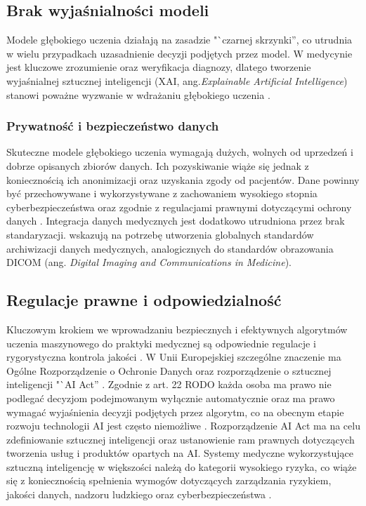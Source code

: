 \subsection{Brak wyjaśnialności modeli}
Modele głębokiego uczenia działają na zasadzie "`czarnej skrzynki'', co utrudnia w wielu przypadkach uzasadnienie decyzji podjętych przez model.
W medycynie jest kluczowe zrozumienie oraz weryfikacja diagnozy, dlatego tworzenie wyjaśnialnej sztucznej inteligencji (XAI, ang.\textit{Explainable Artificial Intelligence}) stanowi poważne wyzwanie w wdrażaniu głębokiego uczenia \cite{Herrera_2023, He_Baxter_Xu_Xu_Zhou_Zhang_2019, Kelly_Karthikesalingam_Suleyman_Corrado_King_2019}.

\subsubsection{Prywatność i bezpieczeństwo danych}
Skuteczne modele głębokiego uczenia wymagają dużych, wolnych od uprzedzeń i dobrze opisanych zbiorów danych.
Ich pozyskiwanie wiąże się jednak z koniecznością ich anonimizacji oraz uzyskania zgody od pacjentów.
Dane powinny być przechowywane i wykorzystywane z zachowaniem wysokiego stopnia cyberbezpieczeństwa oraz zgodnie z regulacjami prawnymi dotyczącymi ochrony danych \cite{Farhud_Zokaei_2021, He_Baxter_Xu_Xu_Zhou_Zhang_2019}.
Integracja danych medycznych jest dodatkowo utrudniona przez brak standaryzacji.
\citet{He_Baxter_Xu_Xu_Zhou_Zhang_2019} wskazują na potrzebę utworzenia globalnych standardów archiwizacji danych medycznych, analogicznych do standardów obrazowania DICOM (ang. \textit{Digital Imaging and Communications in Medicine}).

\subsection{Regulacje prawne i odpowiedzialność}
Kluczowym krokiem we wprowadzaniu bezpiecznych i efektywnych algorytmów uczenia maszynowego do praktyki medycznej są odpowiednie regulacje i rygorystyczna kontrola jakości \cite{Kelly_Karthikesalingam_Suleyman_Corrado_King_2019, He_Baxter_Xu_Xu_Zhou_Zhang_2019}.
W Unii Europejskiej szczególne znaczenie ma Ogólne Rozporządzenie o Ochronie Danych oraz rozporządzenie o sztucznej inteligencji "`AI Act'' \cite{RODO, EU2024AIAct}.
Zgodnie z art. 22 RODO każda osoba ma prawo nie podlegać decyzjom podejmowanym wyłącznie automatycznie oraz ma prawo wymagać wyjaśnienia decyzji podjętych przez algorytm, co na obecnym etapie rozwoju technologii AI jest często niemożliwe \cite{He_Baxter_Xu_Xu_Zhou_Zhang_2019, RODO}.
Rozporządzenie AI Act ma na celu zdefiniowanie sztucznej inteligencji oraz ustanowienie ram prawnych dotyczących tworzenia usług i produktów opartych na AI.
Systemy medyczne wykorzystujące sztuczną inteligencję w większości należą do kategorii wysokiego ryzyka, co wiąże się z koniecznością spełnienia wymogów dotyczących zarządzania ryzykiem, jakości danych, nadzoru ludzkiego oraz cyberbezpieczeństwa \cite{EU2024AIAct, Oirschot_2024}.

